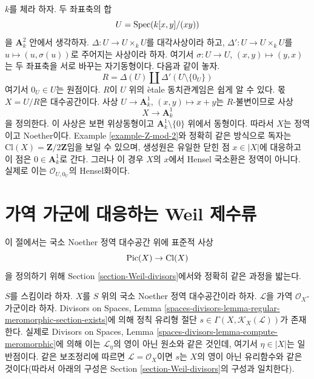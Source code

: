 \begin{example}
\label{example-not-a-domain}
$k$를 체라 하자. 두 좌표축의 합
$$
U = \mathop{\mathrm{Spec}}(k[x, y]/(xy))
$$
을 $\mathbf{A}^2_k$ 안에서 생각하자.
$\Delta : U \to U \times_k U$를 대각사상이라 하고,
$\Delta' : U \to U \times_k U$를 $u \mapsto (u, \sigma(u))$로 주어지는
사상이라 하자. 여기서 $\sigma : U \to U$, $(x, y) \mapsto (y, x)$는
두 좌표축을 서로 바꾸는 자기동형이다. 다음과 같이 놓자.
$$
R = \Delta(U) \amalg \Delta'(U \setminus \{0_U\})
$$
여기서 $0_U \in U$는 원점이다. $R$이 $U$ 위의 \`etale 동치관계임은
쉽게 알 수 있다. 몫 $X = U/R$은 대수공간이다. 사상
$U \to \mathbf{A}^1_k$, $(x, y) \mapsto x + y$는 $R$-불변이므로 사상
$$
X \longrightarrow \mathbf{A}^1_k
$$
을 정의한다. 이 사상은 보편 위상동형이고
$\mathbf{A}^1_k \setminus \{0\}$ 위에서 동형이다. 따라서 $X$는
정역이고 Noether이다. Example \ref{example-Z-mod-2}와 정확히 같은
방식으로 독자는 $\text{Cl}(X) = \mathbf{Z}/2\mathbf{Z}$임을 보일 수
있으며, 생성원은 유일한 닫힌 점 $x \in |X|$에 대응하고 이 점은
$0 \in \mathbf{A}^1_k$로 간다. 그러나 이 경우 $X$의 $x$에서 Hensel 국소환은
정역이 아니다. 실제로 이는 $\mathcal{O}_{U, 0_U}$의 Hensel화이다.
\end{example}














\section{가역 가군에 대응하는 Weil 제수류}
\label{section-c1}

\noindent
이 절에서는 국소 Noether 정역 대수공간 위에 표준적 사상
$$
\mathop{\mathrm{Pic}}\nolimits(X) \to \text{Cl}(X)
$$
을 정의하기 위해 Section \ref{section-Weil-divisors}에서와 정확히 같은
과정을 밟는다.

\medskip\noindent
$S$를 스킴이라 하자. $X$를 $S$ 위의 국소 Noether 정역 대수공간이라
하자. $\mathcal{L}$을 가역 $\mathcal{O}_X$-가군이라 하자. Divisors on
Spaces, Lemma
\ref{spaces-divisors-lemma-regular-meromorphic-section-exists}에 의해 정칙
유리형 절단 $s \in \Gamma(X, \mathcal{K}_X(\mathcal{L}))$가 존재한다.
실제로 Divisors on Spaces, Lemma
\ref{spaces-divisors-lemma-compute-meromorphic}에 의해 이는
$\mathcal{L}_\eta$의 영이 아닌 원소와 같은 것인데, 여기서
$\eta \in |X|$는 일반점이다.
같은 보조정리에 따르면 $\mathcal{L} = \mathcal{O}_X$이면 $s$는 $X$의
영이 아닌 유리함수와 같은 것이다(따라서 아래의 구성은 Section
\ref{section-Weil-divisors}의 구성과 일치한다).

